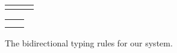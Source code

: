 \begin{center}
\begin{figure}

\begin{tabu}{c c c}
\usebox{\ptone} & \usebox{\pttwo} & \usebox{\ptthree}
\end{tabu}

\begin{prooftree}
\end{prooftree}

\begin{prooftree}
\end{prooftree}

\begin{tabu}{c c}
\usebox{\ptPairElimOne} & \usebox{\ptPairElimTwo}
\\
\usebox{\ptSumIntroOne} & \usebox{\ptSumIntroTwo}
\end{tabu}


\begin{prooftree}
\end{prooftree}

\begin{prooftree}
\end{prooftree}

\caption{The bidirectional typing rules for our system.}
\label{fig:bidirectional-typing-rules}
\end{figure}
\end{center}


